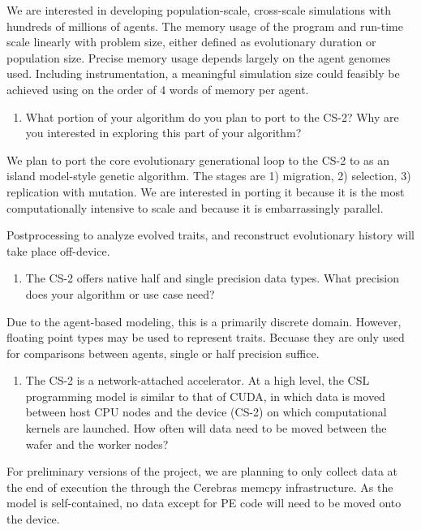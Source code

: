 We are interested in developing population-scale, cross-scale simulations with hundreds of millions of agents.
The memory usage of the program and run-time scale linearly with problem size, either defined as evolutionary duration or population size.
Precise memory usage depends largely on the agent genomes used.
Including instrumentation, a meaningful simulation size could feasibly be achieved using on the order of 4 words of memory per agent.

\begin{enumerate}[resume] \itshape
\item What portion of your algorithm do you plan to port to the CS-2?
Why are you interested in exploring this part of your algorithm?
\end{enumerate}

We plan to port the core evolutionary generational loop to the CS-2 to as an island model-style genetic algorithm.
The stages are 1) migration, 2) selection, 3) replication with mutation.
We are interested in porting it because it is the most computationally intensive to scale and because it is embarrassingly parallel.

Postprocessing to analyze evolved traits, and reconstruct evolutionary history will take place off-device.

\begin{enumerate}[resume] \itshape
\item The CS-2 offers native half and single precision data types.
What precision does your algorithm or use case need?
\end{enumerate}

Due to the agent-based modeling, this is a primarily discrete domain.
However, floating point types may be used to represent traits.
Becuase they are only used for comparisons between agents, single or half precision suffice.

\begin{enumerate}[resume] \itshape
\item The CS-2 is a network-attached accelerator. At a high level, the CSL programming model is similar to that of CUDA, in which data is moved between host CPU nodes and the device (CS-2) on which computational kernels are launched.
How often will data need to be moved between the wafer and the worker nodes?
\end{enumerate}

For preliminary versions of the project, we are planning to only collect data at the end of execution the through the Cerebras memcpy infrastructure.
As the model is self-contained, no data except for PE code will need to be moved onto the device.

